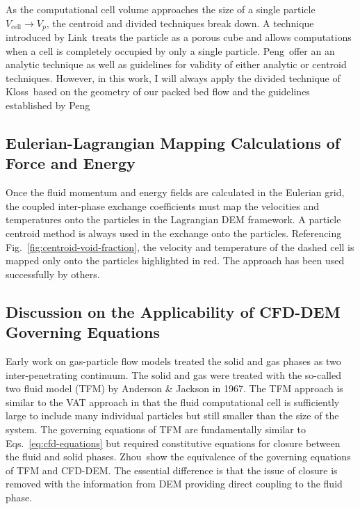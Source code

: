 As the computational cell volume approaches the size of a single particle $V_\text{cell}\rightarrow V_p$, the centroid and divided techniques break down. A technique introduced by Link\etal~treats the particle as a porous cube and allows computations when a cell is completely occupied by only a single particle.\cite{Link2005} Peng\etal~offer an an analytic technique as well as guidelines for validity of either analytic or centroid techniques.\cite{Peng2014} However, in this work, I will always apply the divided technique of Kloss\etal~based on the geometry of our packed bed flow and the guidelines established by Peng\etal\cite{Kloss2012,Peng2014}


\subsection{Eulerian-Lagrangian Mapping Calculations of Force and Energy}
Once the fluid momentum and energy fields are calculated in the Eulerian grid, the coupled inter-phase exchange coefficients must map the velocities and temperatures onto the particles in the Lagrangian DEM framework. A particle centroid method is always used in the exchange onto the particles. Referencing Fig.~\ref{fig:centroid-void-fraction}, the velocity and temperature of the dashed cell is mapped only onto the particles highlighted in red. The approach has been used successfully by others.\cite{Xu1997,Link2005,Kloss2012}







\subsection{Discussion on the Applicability of CFD-DEM Governing Equations}
Early work on gas-particle flow models treated the solid and gas phases as two inter-penetrating continuum. The solid and gas were treated with the so-called two fluid model (TFM) by Anderson \& Jackson in 1967.\cite{Anderson1967} The TFM approach is similar to the VAT approach in that the fluid computational cell is sufficiently large to include many individual particles but still smaller than the size of the system.\cite{Enwald1996} The governing equations of TFM are fundamentally similar to Eqs.~\ref{eq:cfd-equations} but required constitutive equations for closure between the fluid and solid phases. Zhou\etal~show the equivalence of the governing equations of TFM and CFD-DEM.\cite{Zhou2010} The essential difference is that the issue of closure is removed with the information from DEM providing direct coupling to the fluid phase.

